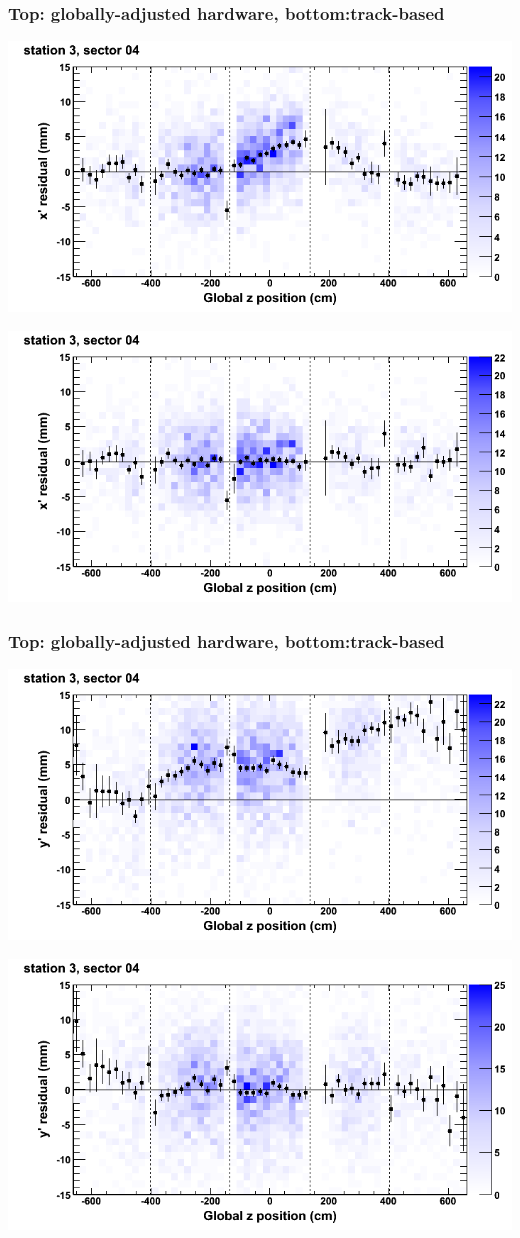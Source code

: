 \documentclass[compress]{beamer}
\begin{document}
\begin{frame}
\frametitle{Top: globally-adjusted hardware, bottom:track-based}
\includegraphics[width=0.7\linewidth]{NOV4_mapplots_HW/DTvsz_st3sec04_x.png}

\includegraphics[width=0.7\linewidth]{NOV4_mapplots/DTvsz_st3sec04_x.png}
\end{frame}

\begin{frame}
\frametitle{Top: globally-adjusted hardware, bottom:track-based}
\includegraphics[width=0.7\linewidth]{NOV4_mapplots_HW/DTvsz_st3sec04_y.png}

\includegraphics[width=0.7\linewidth]{NOV4_mapplots/DTvsz_st3sec04_y.png}
\end{frame}
\end{document}
